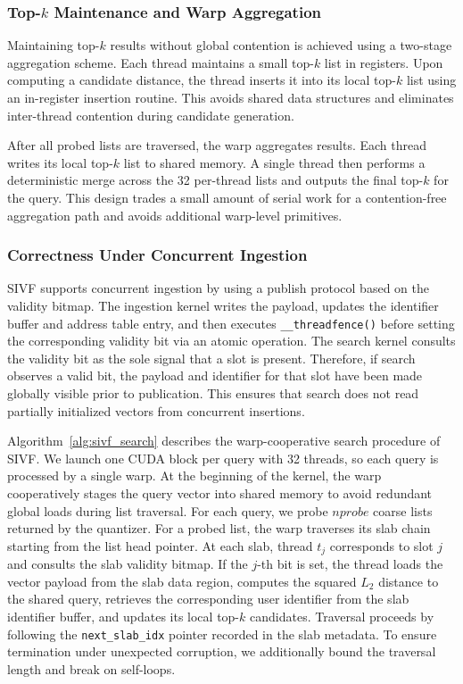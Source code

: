 \documentclass[sigconf,anonymous]{acmart}
\theoremstyle{plain}
\theoremstyle{definition}
\theoremstyle{remark}
\begin{document}
\subsubsection{Top-$k$ Maintenance and Warp Aggregation}

Maintaining top-$k$ results without global contention is achieved using a two-stage aggregation scheme. Each thread maintains a small top-$k$ list in registers. Upon computing a candidate distance, the thread inserts it into its local top-$k$ list using an in-register insertion routine. This avoids shared data structures and eliminates inter-thread contention during candidate generation.

After all probed lists are traversed, the warp aggregates results. Each thread writes its local top-$k$ list to shared memory. A single thread then performs a deterministic merge across the 32 per-thread lists and outputs the final top-$k$ for the query. This design trades a small amount of serial work for a contention-free aggregation path and avoids additional warp-level primitives.

\subsubsection{Correctness Under Concurrent Ingestion}

SIVF supports concurrent ingestion by using a publish protocol based on the validity bitmap. The ingestion kernel writes the payload, updates the identifier buffer and address table entry, and then executes \verb|__threadfence()| before setting the corresponding validity bit via an atomic operation. The search kernel consults the validity bit as the sole signal that a slot is present. Therefore, if search observes a valid bit, the payload and identifier for that slot have been made globally visible prior to publication. This ensures that search does not read partially initialized vectors from concurrent insertions.

Algorithm~\ref{alg:sivf_search} describes the warp-cooperative search procedure of SIVF. 
We launch one CUDA block per query with 32 threads, so each query is processed by a single warp. 
At the beginning of the kernel, the warp cooperatively stages the query vector into shared memory to avoid redundant global loads during list traversal. 
For each query, we probe $nprobe$ coarse lists returned by the quantizer. 
For a probed list, the warp traverses its slab chain starting from the list head pointer. 
At each slab, thread $t_j$ corresponds to slot $j$ and consults the slab validity bitmap. 
If the $j$-th bit is set, the thread loads the vector payload from the slab data region, computes the squared $L_2$ distance to the shared query, retrieves the corresponding user identifier from the slab identifier buffer, and updates its local top-$k$ candidates. 
Traversal proceeds by following the \texttt{next\_slab\_idx} pointer recorded in the slab metadata. 
To ensure termination under unexpected corruption, we additionally bound the traversal length and break on self-loops.
\end{document}
